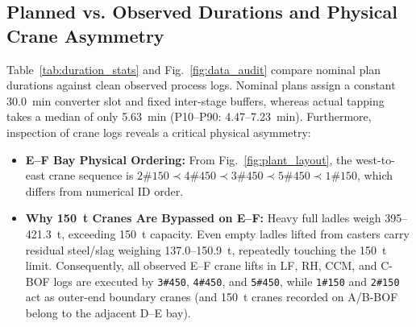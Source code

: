 \documentclass[11pt,a4paper]{article}
\begin{document}
\subsection{Planned vs. Observed Durations and Physical Crane Asymmetry}
Table~\ref{tab:duration_stats} and Fig.~\ref{fig:data_audit} compare nominal plan durations against clean observed process logs. Nominal plans assign a constant 30.0~min converter slot and fixed inter-stage buffers, whereas actual tapping takes a median of only 5.63~min (P10--P90: 4.47--7.23~min). Furthermore, inspection of crane logs reveals a critical physical asymmetry:
\begin{itemize}[leftmargin=1.5em,itemsep=2pt]
  \item \textbf{E--F Bay Physical Ordering:} From Fig.~\ref{fig:plant_layout}, the west-to-east crane sequence is $\text{2\#150} \prec \text{4\#450} \prec \text{3\#450} \prec \text{5\#450} \prec \text{1\#150}$, which differs from numerical ID order.
  \item \textbf{Why 150~t Cranes Are Bypassed on E--F:} Heavy full ladles weigh 395--421.3~t, exceeding 150~t capacity. Even empty ladles lifted from casters carry residual steel/slag weighing 137.0--150.9~t, repeatedly touching the 150~t limit. Consequently, all observed E--F crane lifts in LF, RH, CCM, and C-BOF logs are executed by \texttt{3\#450}, \texttt{4\#450}, and \texttt{5\#450}, while \texttt{1\#150} and \texttt{2\#150} act as outer-end boundary cranes (and 150~t cranes recorded on A/B-BOF belong to the adjacent D--E bay).
\end{itemize}

\begin{table}[htbp]
\centering
\small
\caption{Planned vs. Clean Observed Process Durations Across All Operational Heats (`basic\_duration\_stats.csv`)}
\label{tab:duration_stats}
\end{table}
\end{document}
